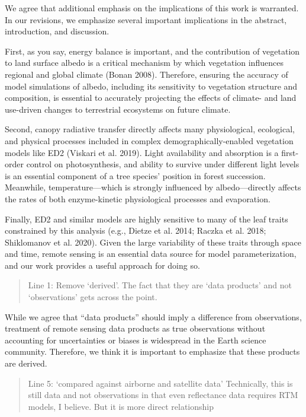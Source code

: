 We agree that additional emphasis on the implications of this work is warranted. In our revisions, we emphasize several important implications in the abstract, introduction, and discussion.

First, as you say, energy balance is important, and the contribution of vegetation to land surface albedo is a critical mechanism by which vegetation influences regional and global climate (Bonan 2008). Therefore, ensuring the accuracy of model simulations of albedo, including its sensitivity to vegetation structure and composition, is essential to accurately projecting the effects of climate- and land use-driven changes to terrestrial ecosystems on future climate.

Second, canopy radiative transfer directly affects many physiological, ecological, and physical processes included in complex demographically-enabled vegetation models like ED2 (Viskari et al. 2019). Light availability and absorption is a first-order control on photosynthesis, and ability to survive under different light levels is an essential component of a tree species’ position in forest succession. Meanwhile, temperature---which is strongly influenced by albedo---directly affects the rates of both enzyme-kinetic physiological processes and evaporation.

Finally, ED2 and similar models are highly sensitive to many of the leaf traits constrained by this analysis (e.g., Dietze et al. 2014; Raczka et al. 2018; Shiklomanov et al. 2020). Given the large variability of these traits through space and time, remote sensing is an essential data source for model parameterization, and our work provides a useful approach for doing so.


\begin{quote}
  Line 1: Remove ‘derived’. The fact that they are ‘data products’ and not ‘observations’ gets across the point.
\end{quote}

While we agree that “data products” should imply a difference from observations, treatment of remote sensing data products as true observations without accounting for uncertainties or biases is widespread in the Earth science community. Therefore, we think it is important to emphasize that these products are derived.


\begin{quote}
  Line 5: ‘compared against airborne and satellite data’ Technically, this is still data and not observations in that even reflectance data requires RTM models, I believe. But it is more direct relationship
\end{quote}

